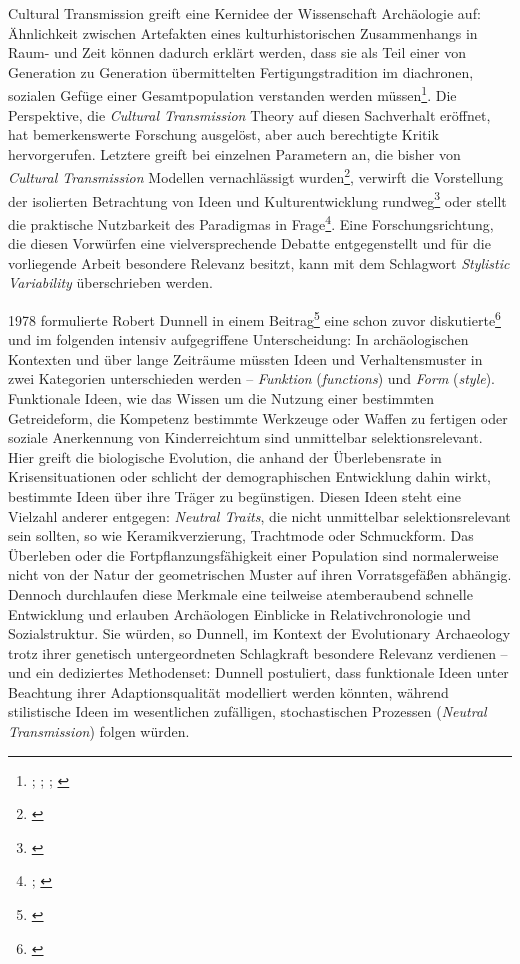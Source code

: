 \documentclass[openany,twoside,twocolumn]{book}
\let\rmarkdownfootnote\footnote%
\def\footnote{\protect\rmarkdownfootnote}
\begin{document}
Cultural Transmission greift eine Kernidee der Wissenschaft Archäologie auf: Ähnlichkeit zwischen Artefakten eines kulturhistorischen Zusammenhangs in Raum- und Zeit können dadurch erklärt werden, dass sie als Teil einer von Generation zu Generation übermittelten Fertigungstradition im diachronen, sozialen Gefüge einer Gesamtpopulation verstanden werden müssen\footnote{\textcite{lyman_culture_2001}; \textcite{lyman_measuring_2000}; \textcite{lyman_rise_1997}; \textcite{obrien_epistemological_2002}}. Die Perspektive, die \emph{Cultural Transmission} Theory auf diesen Sachverhalt eröffnet, hat bemerkenswerte Forschung ausgelöst, aber auch berechtigte Kritik hervorgerufen. Letztere greift bei einzelnen Parametern an, die bisher von \emph{Cultural Transmission} Modellen vernachlässigt wurden\footnote{\textcite{dobres_creativity_2000}}, verwirft die Vorstellung der isolierten Betrachtung von Ideen und Kulturentwicklung rundweg\footnote{\textcite{mithen_cognitive_1997}} oder stellt die praktische Nutzbarkeit des Paradigmas in Frage\footnote{\textcite{dunnell_archaeology_1992}; \textcite{schiffer_memes_2003}}. Eine Forschungsrichtung, die diesen Vorwürfen eine vielversprechende Debatte entgegenstellt und für die vorliegende Arbeit besondere Relevanz besitzt, kann mit dem Schlagwort \emph{Stylistic Variability} überschrieben werden.

1978 formulierte Robert Dunnell in einem Beitrag\footnote{\textcite{dunnell1978style}} eine schon zuvor diskutierte\footnote{\textcite{eerkens_cultural_2007}} und im folgenden intensiv aufgegriffene Unterscheidung: In archäologischen Kontexten und über lange Zeiträume müssten Ideen und Verhaltensmuster in zwei Kategorien unterschieden werden -- \emph{Funktion} (\emph{functions}) und \emph{Form} (\emph{style}). Funktionale Ideen, wie das Wissen um die Nutzung einer bestimmten Getreideform, die Kompetenz bestimmte Werkzeuge oder Waffen zu fertigen oder soziale Anerkennung von Kinderreichtum sind unmittelbar selektionsrelevant. Hier greift die biologische Evolution, die anhand der Überlebensrate in Krisensituationen oder schlicht der demographischen Entwicklung dahin wirkt, bestimmte Ideen über ihre Träger zu begünstigen. Diesen Ideen steht eine Vielzahl anderer entgegen: \emph{Neutral Traits}, die nicht unmittelbar selektionsrelevant sein sollten, so wie Keramikverzierung, Trachtmode oder Schmuckform. Das Überleben oder die Fortpflanzungsfähigkeit einer Population sind normalerweise nicht von der Natur der geometrischen Muster auf ihren Vorratsgefäßen abhängig. Dennoch durchlaufen diese Merkmale eine teilweise atemberaubend schnelle Entwicklung und erlauben Archäologen Einblicke in Relativchronologie und Sozialstruktur. Sie würden, so Dunnell, im Kontext der Evolutionary Archaeology trotz ihrer genetisch untergeordneten Schlagkraft besondere Relevanz verdienen -- und ein dediziertes Methodenset: Dunnell postuliert, dass funktionale Ideen unter Beachtung ihrer Adaptionsqualität modelliert werden könnten, während stilistische Ideen im wesentlichen zufälligen, stochastischen Prozessen (\emph{Neutral Transmission}) folgen würden.
\end{document}
